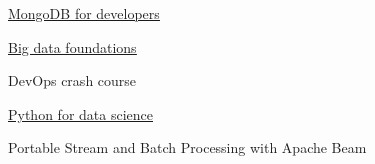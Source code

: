 %
%
%


\begin{coursework}



        {\href{https://university.mongodb.com/course_completion/30f19185172f43e58ae4a0cd9ce13ff0}
        {\underline{MongoDB for developers}}}



        {\href{https://www.youracclaim.com/badges/fb7b0207-6a42-49fc-bf3e-48d139e150c6/public_url}
        {\underline{Big data foundations}}}


        {DevOps crash course}

        {\href{https://courses.edx.org/certificates/0626a02340944e6b9b1854be5e171da0}
        {\underline{Python for data science}}}

        {Portable Stream and Batch Processing with Apache Beam}



\end{coursework}
